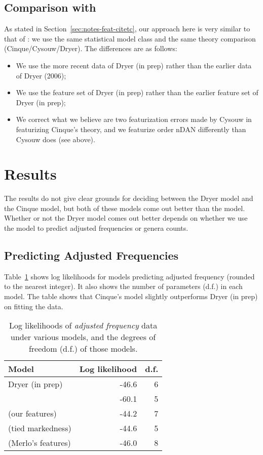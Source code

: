 \documentclass[11pt]{article}
\begin{document}
\subsection{Comparison with \citet{cysouw2010towards}}
\label{sec:comp-with-citetcys}

As stated in Section~\ref{sec:notes-feat-citetc}, our approach here is
very similar to that of \citet{cysouw2010towards}: we use the same
statistical model class and the same theory comparison
(Cinque/Cysouw/Dryer).  The differences are as follows:
%
\begin{itemize}
\item We use the more recent data of Dryer (in prep) rather than the
  earlier data of Dryer (2006);
\item We use the feature set of Dryer (in prep) rather than the
  earlier feature set of Dryer (in prep);
\item We correct what we believe are two featurization errors made by
  Cysouw in featurizing Cinque's theory, and we featurize order nDAN
  differently than Cysouw does (see above).
\end{itemize}


\section{Results}

The results do not give clear grounds for deciding between the Dryer model and the Cinque model, but both of these models come out better than the \citet{cysouw2010dealing} model. Whether or not the Dryer model comes out better depends on whether we use the model to predict adjusted frequencies or genera counts.

\subsection{Predicting Adjusted Frequencies}

Table~\ref{tab:af-likelihoods} shows log likelihoods for models predicting adjusted frequency (rounded to the nearest integer). It also shows the number of parameters (d.f.) in each model. The table shows that Cinque's model slightly outperforms Dryer (in prep) on fitting the data.

\begin{table}
  \centering
  \begin{tabular}{|l|r|r|}
    \hline
    Model & Log likelihood & d.f. \\
    \hline
    Dryer (in prep) & -46.6 & 6 \\
    \citet{cysouw2010dealing} & -60.1 & 5 \\
    \citet{cinque2005deriving} (our features) & -44.2 & 7 \\
    \citet{cinque2005deriving} (tied markedness) & -44.6 & 5 \\
    \citet{cinque2005deriving} (Merlo's features) & -46.0 & 8\\
    \hline
  \end{tabular}
  \caption{Log likelihoods of \emph{adjusted frequency} data under various models, and the degrees of freedom (d.f.) of those models.}
  \label{tab:af-likelihoods}
\end{table}
\end{document}

